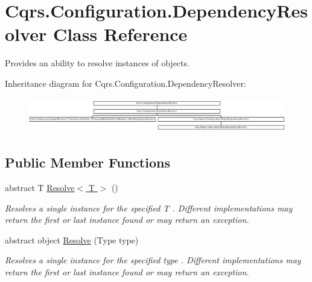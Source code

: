 \hypertarget{classCqrs_1_1Configuration_1_1DependencyResolver}{}\section{Cqrs.\+Configuration.\+Dependency\+Resolver Class Reference}
\label{classCqrs_1_1Configuration_1_1DependencyResolver}


Provides an ability to resolve instances of objects.  


Inheritance diagram for Cqrs.\+Configuration.\+Dependency\+Resolver\+:\begin{figure}[H]
\begin{center}
\leavevmode
\includegraphics[height=1.551247cm]{classCqrs_1_1Configuration_1_1DependencyResolver}
\end{center}
\end{figure}
\subsection*{Public Member Functions}
\begin{DoxyCompactItemize}
\item 
abstract T \hyperlink{classCqrs_1_1Configuration_1_1DependencyResolver_a1eb177fc6c914b45d138642fb6d9454d_a1eb177fc6c914b45d138642fb6d9454d}{Resolve$<$ T $>$} ()
\begin{DoxyCompactList}\small\item\em Resolves a single instance for the specified {\itshape T} . Different implementations may return the first or last instance found or may return an exception. \end{DoxyCompactList}\item 
abstract object \hyperlink{classCqrs_1_1Configuration_1_1DependencyResolver_aaeeb3ad2e0ef44bd98469d843210205c_aaeeb3ad2e0ef44bd98469d843210205c}{Resolve} (Type type)
\begin{DoxyCompactList}\small\item\em Resolves a single instance for the specified {\itshape type} . Different implementations may return the first or last instance found or may return an exception. \end{DoxyCompactList}\end{DoxyCompactItemize}
